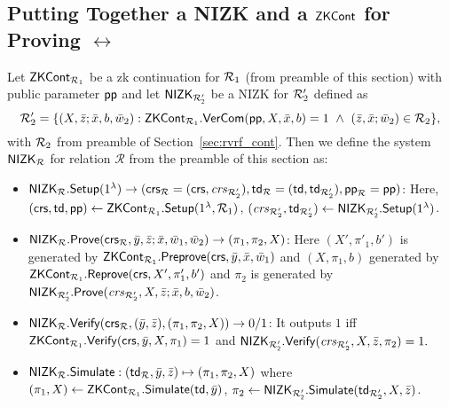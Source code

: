\subsection{Putting Together a NIZK and a $\ZKCont$  for Proving $\rel$} \label{sec:nizkR}

Let $\ZKCont_{\relone}$ be a zk continuation for $\relone$ (from preamble of this section) with public parameter $ \pp $ and 
let $\nizktwo$ be a NIZK for $\reltwo'$ defined as
$$\reltwo' = \{(X, \barz; \barx, b, \baromega_2): \ZKCont_{\relone}.\VerifyCom(\pp, X, \barx, b) =1\ 
\wedge \ (\barz, \barx; \baromega_2) \in \reltwo \},$$ 
with $\reltwo$ from preamble of Section~\ref{sec:rvrf_cont}. Then we define the system $\nizkR$ for relation $\mathcal{R}$ 
from the preamble of this section as:
\begin{itemize}
\item $\nizkR.\Setup(1^{\lambda})\rightarrow (\crsR = (\crs,\crstwo), \twR = (\tw, \twtwo), \pp_\rel = \pp)$: Here,
$(\crs, \tw, \pp) \leftarrow \ZKCont_{\relone}.\Setup(1^{\lambda}, \relone)$, $(\crstwo, \twtwo) \leftarrow \nizktwo.\Setup(1^{\lambda})$.


\item $\nizkR.\Prove(\crsR,\bary, \barz; \barx, \baromega_1, \baromega_2 ) \rightarrow (\pi_1, \pi_2, X)$: Here 
$(X', \pi'_1, b')$ is generated by $\ZKCont_{\relone}.\Preprove(\crs, \bar{y}, \bar{x}, \baromega_1)$ and 
$(X, \pi_1, b)$ generated by  $\ZKCont_{\relone}.\Reprove(\crs, X', \pi_1', b')$ and $ \pi_2 $ is generated by
$ \nizktwo.\Prove(\crstwo, X, \barz; \barx, b, \baromega_2)$. 

\item $\nizkR.\Verify(\crsR,(\bary, \barz), (\pi_1, \pi_2, X)) \rightarrow 0/1$: It outputs $1$ iff 
$\ZKCont_{\relone}.\Verify(\crs, \bar{y}, X, \pi_1) = 1 $ and $ \nizktwo.\Verify(\crstwo, X, \barz, \pi_2) =1.$

\item $\nizkR.\Sim: (\twR, \bary, \barz) \mapsto (\pi_1, \pi_2, X)$ where 
$(\pi_1, X) \leftarrow \ZKCont_{\relone}.\Sim(\tw, \bary)$, $\pi_2 \leftarrow \nizktwo.\Sim(\twtwo, X, \barz)$.
 \end{itemize}

